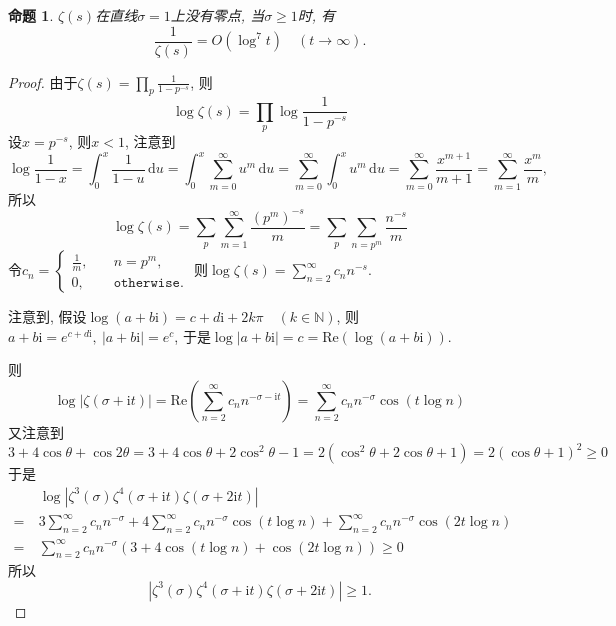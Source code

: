 \documentclass[12pt, a4paper, oneside]{ctexart}
\newtheorem{proposition}{命题}[section]
\numberwithin{equation}{section}  %
\let\geq=\geqslant %
\def\N{\mathbb{N}}          %
\def\d{\mathrm{d}}          %
\def\i{\mathrm{i}}          %
\def\re{\mathrm{Re}}        %
\def\add{\vspace{1ex}}      %
\begin{document}
\begin{proposition}\label{prop-zero-upper}
    $\zeta(s)$在直线$\sigma = 1$上没有零点, 当$\sigma \geq 1$时, 有
    \begin{equation*}
        \frac{1}{\zeta(s)} = O(\log^7 t)\quad(t\to\infty).
    \end{equation*}
\end{proposition}
\begin{proof}
    由于$\zeta(s) = \prod_p\frac{1}{1-p^{-s}}$, 则
    \begin{equation*}
        \log \zeta(s) = \prod_p\log\frac{1}{1-p^{-s}}
    \end{equation*}
    设$x = p^{-s}$, 则$x < 1$, 注意到
    \begin{equation*}
        \log\frac{1}{1-x}=\int_0^x\frac{1}{1-u}\,\d u = \int_0^x\sum_{m=0}^\infty u^m\,\d u=\sum_{m=0}^\infty\int_0^x u^m\,\d u = \sum_{m=0}^\infty\frac{x^{m+1}}{m+1} = \sum_{m=1}^\infty\frac{x^m}{m},
    \end{equation*}
    所以
    \begin{equation*}
        \log\zeta(s) = \sum_{p}\sum_{m=1}^\infty\frac{(p^m)^{-s}}{m} = \sum_{p}\sum_{n=p^m}\frac{n^{-s}}{m}
    \end{equation*}
    令$c_n = \begin{cases}
        \frac{1}{m},&\quad n=p^m,\\
        0,&\quad \mathtt{otherwise}.
    \end{cases}$
    则$\log\zeta(s) = \sum_{n=2}^\infty c_nn^{-s}$.\add

    注意到, 假设$\log(a+b\i) = c+d\i+2k\pi\quad(k\in \N)$, 则$a+b\i = e^{c+d\i},\ |a+b\i| = e^c$, 于是$\log|a+b\i| = c = \re(\log(a+b\i))$.

    则
    \begin{equation*}
        \log|\zeta(\sigma+\i t)| = \re\left(\sum_{n=2}^\infty c_n n^{-\sigma-\i t}\right) = \sum_{n=2}^\infty c_nn^{-\sigma}\cos(t\log n)
    \end{equation*}
    又注意到
    \begin{equation*}
        3+4\cos\theta+\cos2\theta = 3+4\cos \theta+2\cos^2\theta-1 = 2(\cos^2\theta+2\cos\theta + 1) = 2(\cos\theta+1)^2\geq 0
    \end{equation*}
    于是
    \begin{equation*}
        \begin{aligned}
            &\ \log|\zeta^3(\sigma)\zeta^4(\sigma + \i t)\zeta(\sigma + 2\i t)|\\
            =&\ 3\sum_{n=2}^\infty c_nn^{-\sigma}+4\sum_{n=2}^\infty c_nn^{-\sigma}\cos(t\log n)+\sum_{n=2}^\infty c_nn^{-\sigma}\cos(2t\log n)\\
            =&\ \sum_{n=2}^\infty c_nn^{-\sigma}(3+4\cos(t\log n)+\cos(2t\log n))\geq 0
        \end{aligned}
    \end{equation*}
    所以
    \begin{equation}\label{eq-zero-upper-I}
        |\zeta^3(\sigma)\zeta^4(\sigma + \i t)\zeta(\sigma+2\i t)|\geq 1.
    \end{equation}


\end{proof}
\end{document}
